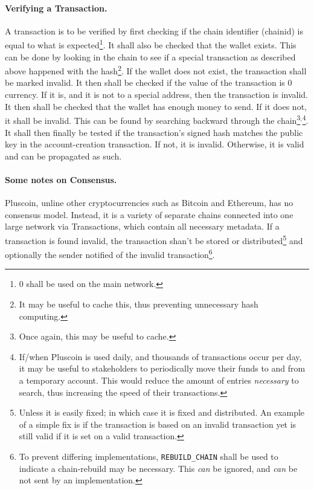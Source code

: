 \documentclass{article}
\begin{document}
\paragraph{Verifying a Transaction.} A transaction is to be verified by first
checking if the chain identifier (chainid) is equal to what is
expected\footnote{$0$ shall be used on the main network.}. It shall also be
checked that the wallet exists.
This can be done by looking in the chain to see if a special transaction
as described above happened with the hash\footnote{It may be useful to cache
this, thus preventing unnecessary hash computing.}. If the wallet does not
exist, the transaction shall be marked invalid. It then shall be checked if the
value of the transaction is 0 currency. If it is, and it is not to
a special address, then the transaction is invalid. It then shall be checked
that the wallet has enough money to send. If it does not, it shall be invalid.
This can be found by searching backward through the chain\footnote{Once
again, this may be useful to cache.}$^,$\footnote{If/when Pluscoin is used
daily, and thousands of transactions occur per day, it may be useful to
stakeholders to periodically move their funds to and from a temporary account.
This would reduce the amount of entries {\it{necessary}} to search, thus
increasing the speed of their transactions.}. It shall then finally be tested
if the transaction's signed hash matches the public key in the account-creation
transaction. If not, it is invalid. Otherwise, it is valid and can be
propagated as such.

\paragraph{Some notes on Consensus.} Pluscoin, unline other cryptocurrencies
such as Bitcoin and Ethereum, has no consensus model. Instead, it is a variety
of separate chains connected into one large network via Transactions,
which contain all necessary metadata. If a transaction is found invalid, the
transaction shan't be stored or distributed\footnote{Unless it is easily fixed;
in which case it is fixed and distributed. An example of a simple fix is if the
transaction is based on an invalid transaction yet is still valid if it is set
on a valid transaction.} and optionally the sender notified of the invalid
transaction\footnote {To prevent differing implementations,
\texttt{REBUILD\_CHAIN} shall be used to indicate a chain-rebuild may be
necessary. This {\it{can}} be ignored, and {\it{can}} be not sent by an
implementation.}.
\end{document}
